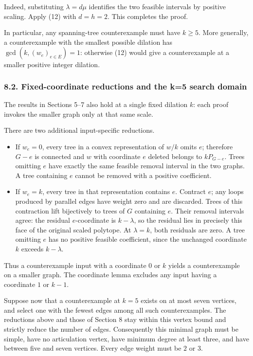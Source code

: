 \documentclass{article}
\begin{document}
Indeed, substituting \(\lambda=d\mu\) identifies the two feasible intervals by positive scaling. Apply (12) with \(d=h=2\). This completes the proof.

In particular, any spanning-tree counterexample must have \(k\ge5\). More generally, a counterexample with the smallest possible dilation has \(\gcd(k,(w_e)_{e\in E})=1\): otherwise (12) would give a counterexample at a smaller positive integer dilation.

\subsubsection{8.2. Fixed-coordinate reductions and the k=5 search domain}

The results in Sections 5--7 also hold at a single fixed dilation \(k\): each proof invokes the smaller graph only at that same scale.

There are two additional input-specific reductions.

\begin{itemize}
\item
  If \(w_e=0\), every tree in a convex representation of \(w/k\) omits \(e\); therefore \(G-e\) is connected and \(w\) with coordinate \(e\) deleted belongs to \(kP_{G-e}\). Trees omitting \(e\) have exactly the same feasible removal interval in the two graphs. A tree containing \(e\) cannot be removed with a positive coefficient.
\item
  If \(w_e=k\), every tree in that representation contains \(e\). Contract \(e\); any loops produced by parallel edges have weight zero and are discarded. Trees of this contraction lift bijectively to trees of \(G\) containing \(e\). Their removal intervals agree: the residual \(e\)-coordinate is \(k-\lambda\), so the residual lies in precisely this face of the original scaled polytope. At \(\lambda=k\), both residuals are zero. A tree omitting \(e\) has no positive feasible coefficient, since the unchanged coordinate \(k\) exceeds \(k-\lambda\).
\end{itemize}

Thus a counterexample input with a coordinate \(0\) or \(k\) yields a counterexample on a smaller graph. The coordinate lemma excludes any input having a coordinate \(1\) or \(k-1\).

Suppose now that a counterexample at \(k=5\) exists on at most seven vertices, and select one with the fewest edges among all such counterexamples. The reductions above and those of Section 8 stay within this vertex bound and strictly reduce the number of edges. Consequently this minimal graph must be simple, have no articulation vertex, have minimum degree at least three, and have between five and seven vertices. Every edge weight must be \(2\) or \(3\).
\end{document}
